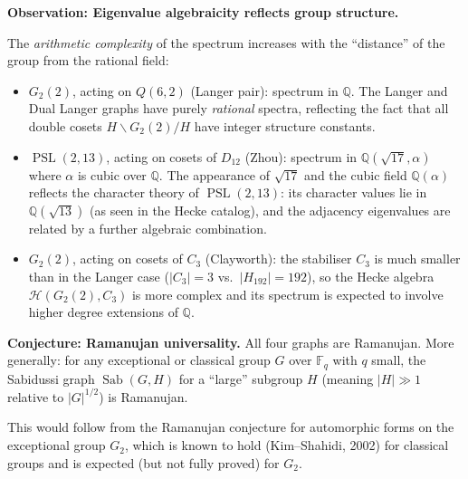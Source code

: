 \documentclass[11pt,a4paper]{article}
\theoremstyle{plain}
\theoremstyle{definition}
\newcommand{\Sab}{\operatorname{Sab}}
\newcommand{\PSL}{\operatorname{PSL}}
\begin{document}
\begin{tcolorbox}[breakable, colback=yellow!12, colframe=yellow!12,
  boxrule=0pt, sharp corners]
\textbf{Observation: Eigenvalue algebraicity reflects group structure.}

The \emph{arithmetic complexity} of the spectrum increases with the
``distance'' of the group from the rational field:

\begin{itemize}
\item $G_2(2)$, acting on $Q(6,2)$ (Langer pair): spectrum in $\mathbb{Q}$.
  The Langer and Dual Langer graphs have purely \emph{rational} spectra,
  reflecting the fact that all double cosets $H \backslash G_2(2) / H$ have
  integer structure constants.

\item $\PSL(2,13)$, acting on cosets of $D_{12}$ (Zhou): spectrum in
  $\mathbb{Q}(\sqrt{17}, \alpha)$ where $\alpha$ is cubic over $\mathbb{Q}$.
  The appearance of $\sqrt{17}$ and the cubic field $\mathbb{Q}(\alpha)$
  reflects the character theory of $\PSL(2,13)$: its character values lie in
  $\mathbb{Q}(\sqrt{13})$ (as seen in the Hecke catalog), and the adjacency
  eigenvalues are related by a further algebraic combination.

\item $G_2(2)$, acting on cosets of $C_3$ (Clayworth): the stabiliser $C_3$
  is much smaller than in the Langer case ($|C_3|=3$ vs.\ $|H_{192}|=192$),
  so the Hecke algebra $\mathcal{H}(G_2(2), C_3)$ is more complex and
  its spectrum is expected to involve higher degree extensions of $\mathbb{Q}$.
\end{itemize}
\end{tcolorbox}

\begin{tcolorbox}[breakable, colback=blue!8, colframe=blue!8,
  boxrule=0pt, sharp corners]
\textbf{Conjecture: Ramanujan universality.}
All four graphs are Ramanujan. More generally: for any exceptional or classical
group $G$ over $\mathbb{F}_q$ with $q$ small, the Sabidussi graph
$\Sab(G, H)$ for a ``large'' subgroup $H$ (meaning $|H| \gg 1$ relative
to $|G|^{1/2}$) is Ramanujan.

This would follow from the Ramanujan conjecture for automorphic forms
on the exceptional group $G_2$, which is known to hold
(Kim--Shahidi, 2002) for classical groups and is expected (but not fully
proved) for $G_2$.
\end{tcolorbox}

\end{document}
